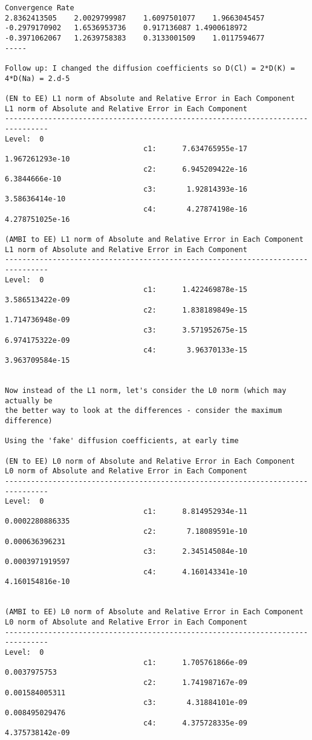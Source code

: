 \documentclass[final]{siamltex}
\begin{document}
\begin{verbatim}
Convergence Rate		
2.8362413505	2.0029799987	1.6097501077	1.9663045457
-0.2979170902	1.6536953736	0.917136087	1.4900618972
-0.3971062067	1.2639758383	0.3133001509	1.0117594677
-----

Follow up: I changed the diffusion coefficients so D(Cl) = 2*D(K) = 4*D(Na) = 2.d-5

(EN to EE) L1 norm of Absolute and Relative Error in Each Component
L1 norm of Absolute and Relative Error in Each Component
--------------------------------------------------------------------------------
Level:  0
                                c1:      7.634765955e-17     1.967261293e-10
                                c2:      6.945209422e-16       6.3844666e-10
                                c3:       1.92814393e-16      3.58636414e-10
                                c4:       4.27874198e-16     4.278751025e-16

(AMBI to EE) L1 norm of Absolute and Relative Error in Each Component
L1 norm of Absolute and Relative Error in Each Component
--------------------------------------------------------------------------------
Level:  0
                                c1:      1.422469878e-15     3.586513422e-09
                                c2:      1.838189849e-15     1.714736948e-09
                                c3:      3.571952675e-15     6.974175322e-09
                                c4:       3.96370133e-15     3.963709584e-15


Now instead of the L1 norm, let's consider the L0 norm (which may actually be
the better way to look at the differences - consider the maximum difference)

Using the 'fake' diffusion coefficients, at early time

(EN to EE) L0 norm of Absolute and Relative Error in Each Component
L0 norm of Absolute and Relative Error in Each Component
--------------------------------------------------------------------------------
Level:  0
                                c1:      8.814952934e-11     0.0002280886335
                                c2:       7.18089591e-10      0.000636396231
                                c3:      2.345145084e-10     0.0003971919597
                                c4:      4.160143341e-10     4.160154816e-10


(AMBI to EE) L0 norm of Absolute and Relative Error in Each Component
L0 norm of Absolute and Relative Error in Each Component
--------------------------------------------------------------------------------
Level:  0
                                c1:      1.705761866e-09        0.0037975753
                                c2:      1.741987167e-09      0.001584005311
                                c3:       4.31884101e-09      0.008495029476
                                c4:      4.375728335e-09     4.375738142e-09



\end{verbatim}
\end{document}
